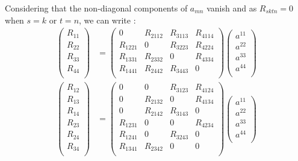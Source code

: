 Considering that the non-diagonal components of $a_{mn}$ vanish and as $R_{sktn}=0$ when $s=k$ or $t=n$, we can write :
\begin{align}
\begin{pmatrix}
 R_{11}\\
 R_{22}\\
 R_{33}\\
 R_{44}\\
\end{pmatrix}&=
\begin{pmatrix}
 0& R_{2112} & R_{3113} & R_{4114} \\
 R_{1221}& 0 &  R_{3223}& R_{4224} \\
 R_{1331}&R_{2332}  & 0 & R_{4334} \\
 R_{1441}& R_{2442} & R_{3443}& 0 \\
\end{pmatrix}\begin{pmatrix}
 a^{11}\\
 a^{22}\\
 a^{33}\\
 a^{44}\\
\end{pmatrix}
\end{align}
\begin{align}
\begin{pmatrix}
 R_{12}\\
 R_{13}\\
 R_{14}\\
 R_{23}\\
 R_{24}\\
 R_{34}\\
\end{pmatrix}&=
\begin{pmatrix}
 0& 0& R_{3123} & R_{4124}  \\
 0& R_{2132} &  0& R_{4134} \\
 0&R_{2142}  &R_{3143} & 0 \\
 R_{1231}& 0 &0& R_{4234} \\
 R_{1241}& 0 &R_{3243}& 0 \\
 R_{1341}& R_{2342} &0& 0 \\
\end{pmatrix}\begin{pmatrix}
 a^{11}\\
 a^{22}\\
 a^{33}\\
 a^{44}\\
\end{pmatrix}\\
\end{align}
